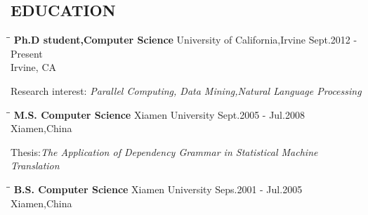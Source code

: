 \documentclass{res}
\begin{document}
\begin{resume}
\section{EDUCATION}          
   \vspace{-0.1in}	
   \begin{tabbing}
  \hspace{2.5in}\= \hspace{3in}\= \kill %
    {\bf Ph.D student,Computer Science} \>  University of California,Irvine \>Sept.2012 - Present\\
                             \>Irvine, CA
   \end{tabbing}\vspace{-20pt}      %
   Research interest:\emph{ Parallel Computing, Data Mining,Natural Language Processing}
   \vspace{-0.1in}	
   \begin{tabbing}
   \hspace{2.5in}\= \hspace{3in}\= \kill %
    {\bf M.S. Computer Science} \>Xiamen University     \>Sept.2005 - Jul.2008\\
                             \>Xiamen,China
   \end{tabbing}\vspace{-20pt}      %
    Thesis:\emph{The Application of Dependency Grammar in Statistical Machine Translation}
   \vspace{-0.1in}	
   \begin{tabbing}
   \hspace{2.5in}\= \hspace{3in}\= \kill %
    {\bf B.S. Computer Science} \>Xiamen University     \>Seps.2001 - Jul.2005\\
                             \>Xiamen,China
   \end{tabbing}\vspace{-20pt}      %
 

\end{resume}
\end{document}
